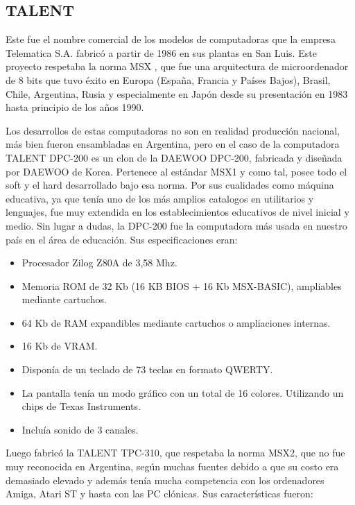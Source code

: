 \documentclass[%
 	final,
%
	notitlepage,
	narroweqnarray,
	inline,
 	twoside,
	]{ieee}
\begin{document}
\subsection*{TALENT}

Este fue el nombre comercial de los modelos de computadoras que la empresa Telematica S.A. fabric\'o a partir de 1986 en sus plantas en San Luis. Este proyecto respetaba la norma MSX \cite{msx}, que fue una arquitectura de microordenador de 8 bits que tuvo \'exito en Europa (Espa\~na, Francia y Pa\'ises Bajos), Brasil, Chile, Argentina, Rusia y especialmente en Jap\'on desde su presentaci\'on en 1983 hasta principio de los a\~nos 1990.

Los desarrollos de estas computadoras no son en realidad producci\'on nacional, m\'as bien fueron ensambladas en Argentina, pero en el caso de la computadora TALENT DPC-200 es un clon de la DAEWOO DPC-200, fabricada y dise\~nada por DAEWOO de Korea. Pertenece al est\'andar MSX1 y como tal, posee todo el soft y el hard desarrollado bajo esa norma.
Por sus cualidades como m\'aquina educativa, ya que ten\'ia uno de los m\'as amplios catalogos en utilitarios y lenguajes, fue muy extendida en los establecimientos educativos de nivel inicial y medio. Sin lugar a dudas, la DPC-200 fue la computadora m\'as usada en nuestro pa\'is en el \'area de educaci\'on. Sus especificaciones eran:

\begin{itemize}
\item Procesador Zilog Z80A de 3,58 Mhz.
\item Memoria ROM de 32 Kb (16 KB BIOS + 16 Kb MSX-BASIC), ampliables mediante cartuchos.
\item 64 Kb de RAM expandibles mediante cartuchos o ampliaciones internas.
\item 16 Kb de VRAM.
\item Dispon\'ia de un teclado de 73 teclas en formato QWERTY.
\item La pantalla ten\'ia un modo gr\'afico con un total de 16 colores. Utilizando un chips de Texas Instruments.
\item Inclu\'ia sonido de 3 canales.
\end{itemize}

Luego fabric\'o la TALENT TPC-310, que respetaba la norma MSX2, que no fue muy reconocida en Argentina, seg\'un muchas fuentes debido a que su costo era demasiado elevado y adem\'as ten\'ia mucha competencia con los ordenadores Amiga, Atari ST y hasta con las PC cl\'onicas.
Sus caracter\'isticas fueron:
\end{document}
